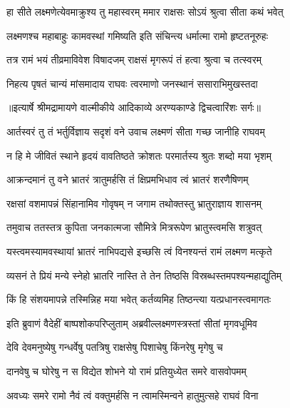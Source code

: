 \twolineshloka
{हा सीते लक्ष्मणेत्येवमाक्रुश्य तु महास्वरम्}
{ममार राक्षसः सोऽयं श्रुत्वा सीता कथं भवेत्} %

\twolineshloka
{लक्ष्मणश्च महाबाहुः कामवस्थां गमिष्यति}
{इति संचिन्त्य धर्मात्मा रामो हृष्टतनूरुहः} %

\twolineshloka
{तत्र रामं भयं तीव्रमाविवेश विषादजम्}
{राक्षसं मृगरूपं तं हत्वा श्रुत्वा च तत्स्वरम्} %

\twolineshloka
{निहत्य पृषतं चान्यं मांसमादाय राघवः}
{त्वरमाणो जनस्थानं ससाराभिमुखस्तदा} %


{॥इत्यार्षे श्रीमद्रामायणे वाल्मीकीये आदिकाव्ये अरण्यकाण्डे द्विचत्वारिंशः सर्गः॥}


\twolineshloka
{आर्तस्वरं तु तं भर्तुर्विज्ञाय सदृशं वने}
{उवाच लक्ष्मणं सीता गच्छ जानीहि राघवम्} %

\twolineshloka
{न हि मे जीवितं स्थाने हृदयं वावतिष्ठते}
{क्रोशतः परमार्तस्य श्रुतः शब्दो मया भृशम्} %

\twolineshloka
{आक्रन्दमानं तु वने भ्रातरं त्रातुमर्हसि}
{तं क्षिप्रमभिधाव त्वं भ्रातरं शरणैषिणम्} %

\twolineshloka
{रक्षसां वशमापन्नं सिंहानामिव गोवृषम्}
{न जगाम तथोक्तस्तु भ्रातुराज्ञाय शासनम्} %

\twolineshloka
{तमुवाच ततस्तत्र कुपिता जनकात्मजा}
{सौमित्रे मित्ररूपेण भ्रातुस्त्वमसि शत्रुवत्} %

\twolineshloka
{यस्त्वमस्यामवस्थायां भ्रातरं नाभिपद्यसे}
{इच्छसि त्वं विनश्यन्तं रामं लक्ष्मण मत्कृते} %

\twolineshloka
{व्यसनं ते प्रियं मन्ये स्नेहो भ्रातरि नास्ति ते}
{तेन तिष्ठसि विस्रब्धस्तमपश्यन्महाद्युतिम्} %

\twolineshloka
{किं हि संशयमापन्ने तस्मिन्निह मया भवेत्}
{कर्तव्यमिह तिष्ठन्त्या यत्प्रधानस्त्वमागतः} %

\twolineshloka
{इति ब्रुवाणं वैदेहीं बाष्पशोकपरिप्लुताम्}
{अब्रवील्लक्ष्मणस्त्रस्तां सीतां मृगवधूमिव} %

\twolineshloka
{देवि देवमनुष्येषु गन्धर्वेषु पतत्रिषु}
{राक्षसेषु पिशाचेषु किंनरेषु मृगेषु च} %

\twolineshloka
{दानवेषु च घोरेषु न स विद्येत शोभने}
{यो रामं प्रतियुध्येत समरे वासवोपमम्} %

\twolineshloka
{अवध्यः समरे रामो नैवं त्वं वक्तुमर्हसि}
{न त्वामस्मिन्वने हातुमुत्सहे राघवं विना} %

